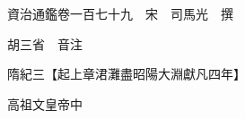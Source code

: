 










 


 
 


 

  
  
  
  
  





  
  
  
  
  
 
  

  

  
  
  



  

 
 

  
   




  

  
  


  　　資治通鑑卷一百七十九　宋　司馬光　撰

　　胡三省　音注

　　隋紀三【起上章涒灘盡昭陽大淵獻凡四年】

　　高祖文皇帝中

